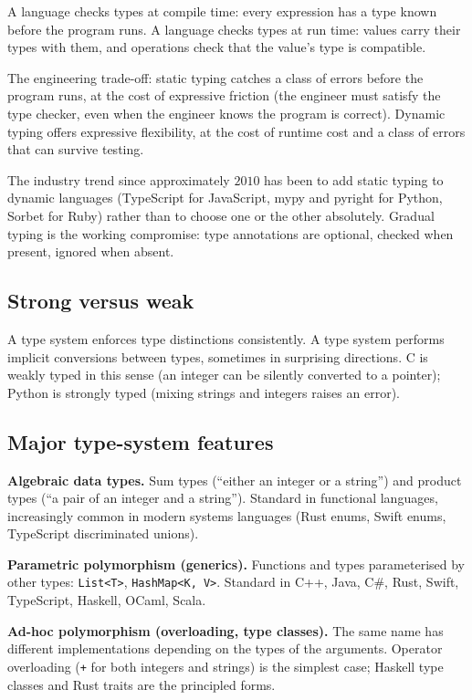 A  language checks types at compile time: every expression has a type known before the program runs. A  language checks types at run time: values carry their types with them, and operations check that the value's type is compatible.

The engineering trade-off: static typing catches a class of errors before the program runs, at the cost of expressive friction (the engineer must satisfy the type checker, even when the engineer knows the program is correct). Dynamic typing offers expressive flexibility, at the cost of runtime cost and a class of errors that can survive testing.

The industry trend since approximately $2010$ has been to add static typing to dynamic languages (TypeScript for JavaScript, mypy and pyright for Python, Sorbet for Ruby) rather than to choose one or the other absolutely. Gradual typing is the working compromise: type annotations are optional, checked when present, ignored when absent.

\subsection{Strong versus weak}

A  type system enforces type distinctions consistently. A  type system performs implicit conversions between types, sometimes in surprising directions. C is weakly typed in this sense (an integer can be silently converted to a pointer); Python is strongly typed (mixing strings and integers raises an error).

\subsection{Major type-system features}

\textbf{Algebraic data types.} Sum types (``either an integer or a string'') and product types (``a pair of an integer and a string''). Standard in functional languages, increasingly common in modern systems languages (Rust enums, Swift enums, TypeScript discriminated unions).

\textbf{Parametric polymorphism (generics).} Functions and types parameterised by other types: \texttt{List<T>}, \texttt{HashMap<K, V>}. Standard in C++, Java, C\#, Rust, Swift, TypeScript, Haskell, OCaml, Scala.

\textbf{Ad-hoc polymorphism (overloading, type classes).} The same name has different implementations depending on the types of the arguments. Operator overloading (\texttt{+} for both integers and strings) is the simplest case; Haskell type classes and Rust traits are the principled forms.

